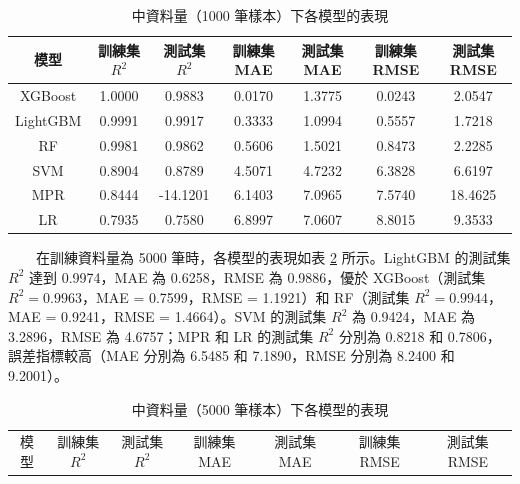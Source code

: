 \documentclass[12pt,a4paper]{article}
\begin{document}
\begin{enumerate}
\begin{enumerate}[label=\arabic*.]
\begin{enumerate}[label=3-2-\arabic*.]
\begin{enumerate}[label=\Alph*.]
                    \begin{table}[H]
                        \centering
                        \caption{中資料量（1000 筆樣本）下各模型的表現}
                        \label{table:medium_data_1000}
                        \begin{tabular}{|c|c|c|c|c|c|c|}
                            \hline
                            模型 & 訓練集 \( R^2 \) & 測試集 \( R^2 \) & 訓練集 MAE & 測試集 MAE & 訓練集 RMSE & 測試集 RMSE \\
                            \hline
                            XGBoost & 1.0000 & 0.9883 & 0.0170 & 1.3775 & 0.0243 & 2.0547 \\
                            LightGBM & 0.9991 & 0.9917 & 0.3333 & 1.0994 & 0.5557 & 1.7218 \\
                            RF & 0.9981 & 0.9862 & 0.5606 & 1.5021 & 0.8473 & 2.2285 \\
                            SVM & 0.8904 & 0.8789 & 4.5071 & 4.7232 & 6.3828 & 6.6197 \\
                            MPR & 0.8444 & -14.1201 & 6.1403 & 7.0965 & 7.5740 & 18.4625 \\
                            LR & 0.7935 & 0.7580 & 6.8997 & 7.0607 & 8.8015 & 9.3533 \\
                            \hline
                        \end{tabular}
                    \end{table}
                　　在訓練資料量為 5000 筆時，各模型的表現如表 \ref{table:medium_data_5000} 所示。LightGBM 的測試集 \( R^2 \) 達到 0.9974，MAE 為 0.6258，RMSE 為 0.9886，優於 XGBoost（測試集 \( R^2 = 0.9963 \)，MAE = 0.7599，RMSE = 1.1921）和 RF（測試集 \( R^2 = 0.9944 \)，MAE = 0.9241，RMSE = 1.4664）。SVM 的測試集 \( R^2 \) 為 0.9424，MAE 為 3.2896，RMSE 為 4.6757；MPR 和 LR 的測試集 \( R^2 \) 分別為 0.8218 和 0.7806，誤差指標較高（MAE 分別為 6.5485 和 7.1890，RMSE 分別為 8.2400 和 9.2001）。\\
                        \begin{table}[H]
                            \centering
                            \caption{中資料量（5000 筆樣本）下各模型的表現}
                            \label{table:medium_data_5000}
                            \begin{tabular}{|c|c|c|c|c|c|c|}
                                \hline
                                模型 & 訓練集 \( R^2 \) & 測試集 \( R^2 \) & 訓練集 MAE & 測試集 MAE & 訓練集 RMSE & 測試集 RMSE \\

\end{tabular}
\end{table}
\end{enumerate}
\end{enumerate}
\end{enumerate}
\end{enumerate}
\end{document}
